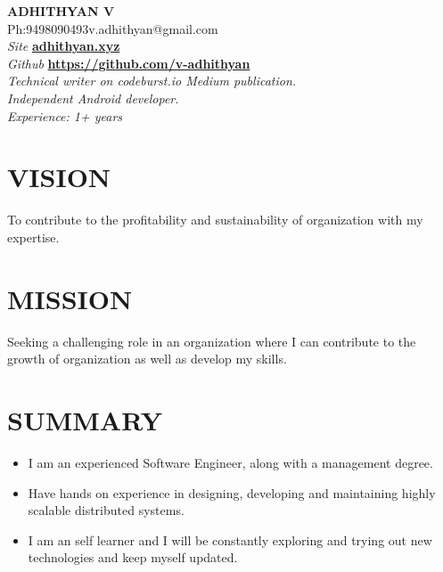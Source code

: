 \documentclass[11pt,a4paper]{article}
\begin{document}
\begin{center}
{\LARGE{\textbf{ADHITHYAN V}}}\\
{Ph:9498090493\hfill}{\hfill v.adhithyan@gmail.com} \\
\emph{Site} \textbf{\href{adhithyan.xyz}{adhithyan.xyz}} \\
\emph{Github} \textbf{\href{https://github.com/v-adhithyan}{https://github.com/v-adhithyan}}\\
\emph{Technical writer on codeburst.io Medium publication.}\\
\emph{Independent Android developer.}\\
\emph{Experience: 1+ years}
\noindent\makebox[\linewidth]{\rule{\paperwidth}{0.4pt}}
\end{center}
\begin{multicols}{2}
\section*{VISION}
\par To contribute to the profitability and sustainability of organization with my expertise.
\section*{MISSION}
\par Seeking a challenging role in an organization where I can contribute to the growth of organization as well as develop my skills.
\end{multicols}
\section*{SUMMARY}
\begin{itemize}[noitemsep]
\item I am an experienced Software Engineer, along with a management degree.
\item Have hands on experience in designing, developing and maintaining highly scalable distributed systems.
\item I am an self learner and I will be constantly exploring and trying out new technologies and keep myself updated.
\end{itemize}
\end{document}

